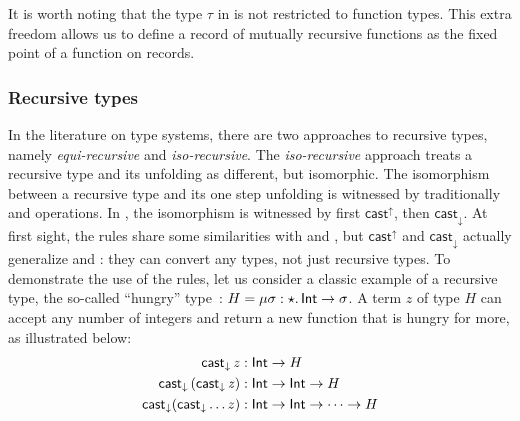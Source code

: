 It is worth noting that the type $\tau$ in  is not
restricted to function types. This extra freedom allows us to define a
record of mutually recursive functions as the fixed point of a
function on records.


\subsubsection{Recursive types}
In the literature on type systems, there are two approaches to
recursive types, namely \emph{equi-recursive} and
\emph{iso-recursive}. The \emph{iso-recursive} approach treats a
recursive type and its unfolding as different, but isomorphic. The
isomorphism between a recursive type and its one step unfolding is
witnessed by traditionally \fold and \unfold operations. In \name, the
isomorphism is witnessed by first $ \mathsf{cast}^{\uparrow} $, then
$ \mathsf{cast}_{\downarrow} $.    At first sight, the \cast rules share some
similarities with \fold and \unfold, but $ \mathsf{cast}^{\uparrow} $ and
$ \mathsf{cast}_{\downarrow} $ actually generalize \fold and \unfold: they can convert
any types, not just recursive types. To demonstrate the use of the
\cast rules, let us consider a classic example of a recursive type,
the so-called ``hungry'' type~\cite{tapl}:
$H = \mu \sigma:\star.\,\mathsf{Int} \rightarrow \sigma$. A term $z$
of type $H$ can accept any number of integers and return a new
function that is hungry for more, as illustrated below:
\begin{align*}
\mathsf{cast}_{\downarrow} \, \mathit{z} &:  \mathsf{Int}  \rightarrow H  \\
\mathsf{cast}_{\downarrow} \, (  \mathsf{cast}_{\downarrow} \, \mathit{z}  ) &:  \mathsf{Int}  \rightarrow  \mathsf{Int}  \rightarrow H \\
 \mathsf{cast}_{\downarrow} ( \mathsf{cast}_{\downarrow}  \dots z) &:  \mathsf{Int}  \rightarrow  \mathsf{Int}  \rightarrow \dots \rightarrow H
\end{align*}



